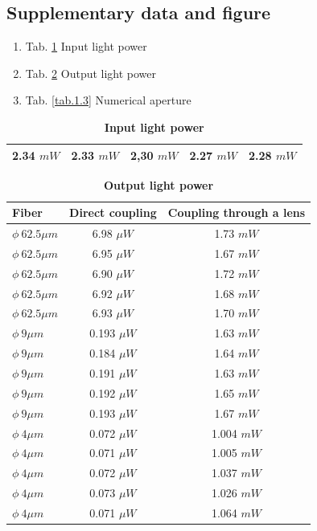 \documentclass[12pt,a4paper,UTF8]{article}
\begin{document}
    \subsection{Supplementary data and figure}
    \begin{enumerate}[label=\arabic*.]
        \item Tab. \ref{tab.1.1} Input light power
        \item Tab. \ref{tab.1.2} Output light power
        \item Tab. \ref{tab.1.3} Numerical aperture
    \end{enumerate}
    \begin{table}[htbp]
        \centering
            \begin{tabular}{ccccc}
                \toprule
                2.34 $mW$    &2.33 $mW$  &2,30 $mW$  &2.27 $mW$   &2.28 $mW$ \\
                \bottomrule
            \end{tabular}
            \caption{\textbf{Input light power}}
            \label{tab.1.1}
    \end{table}	

    \begin{table}[ht]
        \centering
            \begin{tabular}{lcc}
                \toprule
                Fiber &Direct coupling &Coupling through a lens  \\
                \midrule
                $\phi \ 62.5 \mu m$ & 6.98 $\mu W$ & 1.73 $mW$ \\
                $\phi \ 62.5 \mu m$ & 6.95 $\mu W$ & 1.67 $mW$ \\
                $\phi \ 62.5 \mu m$ & 6.90 $\mu W$ & 1.72 $mW$ \\
                $\phi \ 62.5 \mu m$ & 6.92 $\mu W$ & 1.68 $mW$ \\
                $\phi \ 62.5 \mu m$ & 6.93 $\mu W$ & 1.70 $mW$ \\
                $\phi \ 9 \mu m$ & 0.193 $\mu W$ & 1.63 $mW$ \\
                $\phi \ 9 \mu m$ & 0.184 $\mu W$ & 1.64 $mW$ \\
                $\phi \ 9 \mu m$ & 0.191 $\mu W$ & 1.63 $mW$ \\
                $\phi \ 9 \mu m$ & 0.192 $\mu W$ & 1.65 $mW$ \\
                $\phi \ 9 \mu m$ & 0.193 $\mu W$ & 1.67 $mW$ \\
                $\phi \ 4 \mu m$ & 0.072 $\mu W$ & 1.004 $mW$ \\
                $\phi \ 4 \mu m$ & 0.071 $\mu W$ & 1.005 $mW$ \\
                $\phi \ 4 \mu m$ & 0.072 $\mu W$ & 1.037 $mW$ \\
                $\phi \ 4 \mu m$ & 0.073 $\mu W$ & 1.026 $mW$ \\
                $\phi \ 4 \mu m$ & 0.071 $\mu W$ & 1.064 $mW$ \\
                \bottomrule
            \end{tabular}
            \caption{\textbf{Output light power}}
            \label{tab.1.2}
    \end{table}	
\end{document}
